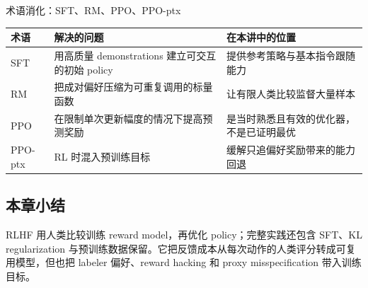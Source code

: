 \begin{knowledgebox}{术语消化：SFT、RM、PPO、PPO-ptx}
\begin{tabularx}{\textwidth}{L{2.2cm} >{\raggedright\arraybackslash}X >{\raggedright\arraybackslash}X}
\toprule
术语 & 解决的问题 & 在本讲中的位置 \\
\midrule
SFT & 用高质量 demonstrations 建立可交互的初始 policy & 提供参考策略与基本指令跟随能力 \\
RM & 把成对偏好压缩为可重复调用的标量函数 & 让有限人类比较监督大量样本 \\
PPO & 在限制单次更新幅度的情况下提高预测奖励 & 是当时熟悉且有效的优化器，不是已证明最优 \\
PPO-ptx & RL 时混入预训练目标 & 缓解只追偏好奖励带来的能力回退 \\
\bottomrule
\end{tabularx}
\end{knowledgebox}


\subsection{本章小结}

RLHF 用人类比较训练 reward model，再优化 policy；完整实践还包含 SFT、KL regularization 与预训练数据保留。它把反馈成本从每次动作的人类评分转成可复用模型，但也把 labeler 偏好、reward hacking 和 proxy misspecification 带入训练目标。

